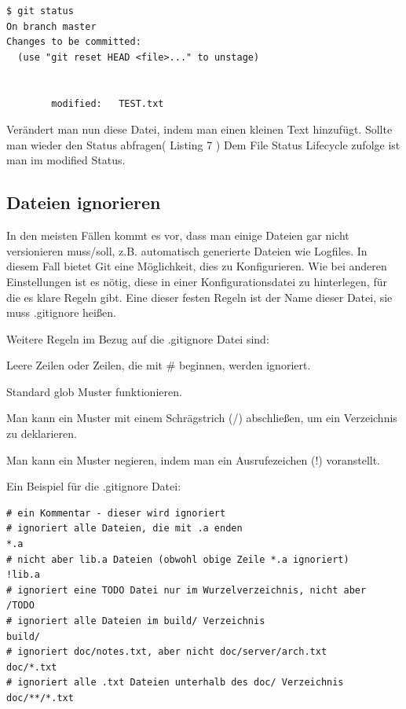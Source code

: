 \documentclass[12pt,a4paper,bibliography=totocnumbered,listof=totocnumbered]{scrartcl}
\begin{document}
\vspace{1em}
\begin{lstlisting}[caption=Git Statusbefehl nachdem verändern einer Datei, label=lst:arduino]
$ git status
On branch master
Changes to be committed:
  (use "git reset HEAD <file>..." to unstage)

      
        modified:   TEST.txt

\end{lstlisting}
Verändert man nun diese Datei, indem man einen kleinen Text hinzufügt. Sollte man wieder den Status abfragen( Listing 7 )
Dem File Status Lifecycle zufolge ist man im modified Status. 

\subsection{ Dateien ignorieren}
In den meisten Fällen kommt es vor, dass man einige Dateien gar nicht versionieren muss/soll, z.B. automatisch generierte Dateien wie Logfiles. In diesem Fall bietet Git eine Möglichkeit, dies zu Konfigurieren. Wie bei anderen Einstellungen ist es nötig, diese in einer Konfigurationsdatei zu hinterlegen, für die es klare Regeln gibt. Eine dieser festen Regeln ist der Name dieser Datei, sie muss .gitignore heißen.

Weitere Regeln im Bezug auf die .gitignore Datei sind:

\begin{compactitem}
	\item Leere Zeilen oder Zeilen, die mit # beginnen, werden ignoriert.
	\item Standard glob Muster funktionieren.
	\item Man kann ein Muster mit einem Schrägstrich (/) abschließen, um ein Verzeichnis zu deklarieren.
	\item  Man kann ein Muster negieren, indem man ein Ausrufezeichen (!) voranstellt.
\end{compactitem}

Ein Beispiel für die .gitignore Datei:
\vspace{1em}
\begin{lstlisting}[caption=Git Einstellungen der.gitignore Datei, label=lst:arduino]
# ein Kommentar - dieser wird ignoriert
# ignoriert alle Dateien, die mit .a enden
*.a
# nicht aber lib.a Dateien (obwohl obige Zeile *.a ignoriert)
!lib.a
# ignoriert eine TODO Datei nur im Wurzelverzeichnis, nicht aber
/TODO
# ignoriert alle Dateien im build/ Verzeichnis
build/
# ignoriert doc/notes.txt, aber nicht doc/server/arch.txt
doc/*.txt
# ignoriert alle .txt Dateien unterhalb des doc/ Verzeichnis
doc/**/*.txt
\end{lstlisting}
\end{document}
